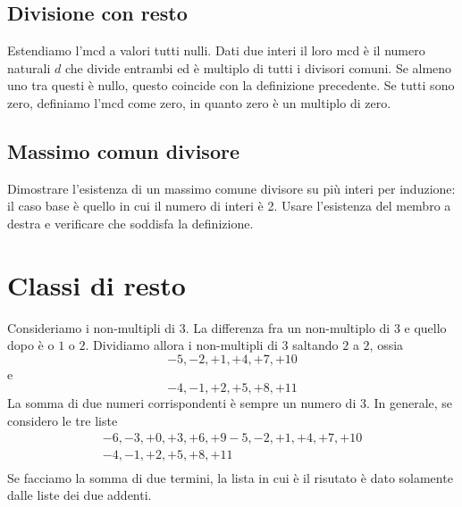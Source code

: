 \documentclass[a4paper]{article}
\begin{document}
\subsection{Divisione con resto}

Estendiamo l'mcd a valori tutti nulli.
Dati due interi il loro mcd è il numero naturali
\(d\) che divide entrambi ed è multiplo di tutti i divisori comuni.
Se almeno uno tra questi è nullo, questo coincide con la definizione precedente.
Se tutti sono zero, definiamo l'mcd come zero, in quanto zero è un multiplo di zero.

\subsection{Massimo comun divisore}

Dimostrare l'esistenza di un massimo comune divisore su più interi
per induzione: il caso base è quello in cui il numero di interi è 2.
Usare l'esistenza del membro a destra e verificare che soddisfa la definizione.


\section{Classi di resto}

Consideriamo i non-multipli di \(3\). La differenza fra un non-multiplo di 3 e quello dopo è 
o \(1\) o \(2\). Dividiamo allora i non-multipli di 3 saltando \(2\) a \(2\), ossia
\[
    -5, -2, +1, +4, +7, +10
\]
e
\[
    -4, -1, +2, +5, +8, +11
\]
La somma di due numeri corrispondenti è sempre un numero di 3.
In generale, se considero le tre liste
\begin{align*}
    -6, -3, +0, +3, +6, +9
    -5, -2, +1, +4, +7, +10 \\
    -4, -1, +2, +5, +8, +11 \\
\end{align*}
Se facciamo la somma di due termini, la lista in cui è il risutato è dato solamente dalle liste
dei due addenti.
\end{document}
